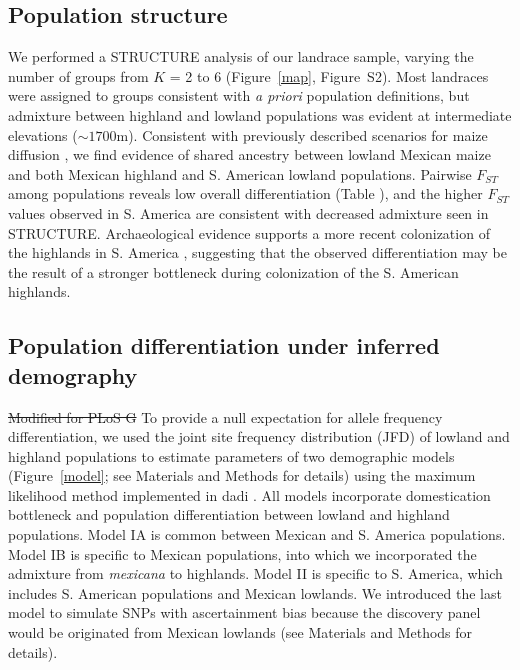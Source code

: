 \subsection*{Population structure}

We performed a {\sf STRUCTURE} analysis \cite[]{Pritchard_2000_10835412,Falush_2003_12930761} of our landrace sample, varying the number of groups from $K$ = 2 to 6 (Figure~\ref{map}, Figure~S2). 
Most landraces were assigned to groups consistent with \emph{a priori} population definitions, but admixture between highland and lowland populations was evident at intermediate elevations ($\sim1700$m).  Consistent with previously described scenarios for maize diffusion \cite[]{Piperno_2006_69}, we find evidence of shared ancestry between lowland Mexican maize and both Mexican highland and S. American lowland populations.  Pairwise $F_{ST}$ among populations reveals low overall differentiation (Table \label{FstP}), and the higher $F_{ST}$ values observed in S. America are consistent with decreased admixture seen in STRUCTURE.  Archaeological evidence supports a more recent colonization of the highlands in S. America  \cite[]{Piperno_2006_69,Perry_2006_16511492,Grobman_2012_22307642}, suggesting that the observed differentiation may be the result of a stronger bottleneck during colonization of the S. American highlands. 

\subsection*{Population differentiation under inferred demography}

\st{Modified for PLoS G}
To provide a null expectation for allele frequency differentiation, we used the joint site frequency distribution (JFD) of lowland and highland populations to estimate parameters of two demographic models (Figure~\ref{model}; see Materials and Methods for details) using the maximum likelihood method implemented in {\sf dadi} \citep{Gutenkunst_2009_19851460}.  
All models incorporate domestication bottleneck \cite[]{Wright_2005_15919994} and population differentiation between lowland and highland populations.
Model IA is common between Mexican and S. America populations.
Model IB is specific to Mexican populations, into which we incorporated the admixture from \emph{mexicana} to highlands.
Model II is specific to S. America, which includes S. American populations and Mexican lowlands.  
We introduced the last model to simulate SNPs with ascertainment bias because the discovery panel would be originated from Mexican lowlands (see Materials and Methods for details).

